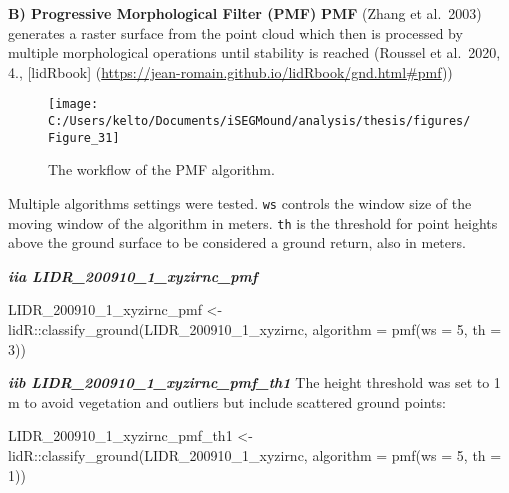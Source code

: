 \documentclass[
  12pt,
]{article}
\newenvironment{Shaded}{\begin{snugshade}}{\end{snugshade}}
\newcommand{\AttributeTok}[1]{\textcolor[rgb]{0.77,0.63,0.00}{#1}}
\newcommand{\DecValTok}[1]{\textcolor[rgb]{0.00,0.00,0.81}{#1}}
\newcommand{\FunctionTok}[1]{\textcolor[rgb]{0.00,0.00,0.00}{#1}}
\newcommand{\NormalTok}[1]{#1}
\newcommand{\OtherTok}[1]{\textcolor[rgb]{0.56,0.35,0.01}{#1}}
\newcommand{\SpecialCharTok}[1]{\textcolor[rgb]{0.00,0.00,0.00}{#1}}
\begin{document}
\textbf{B) Progressive Morphological Filter (PMF)}
\newline
\textbf{PMF} (Zhang et al.~2003) generates a raster surface from the point cloud which then is processed by multiple morphological operations until stability is reached (Roussel et al.~2020, 4., {[}lidRbook{]} (\url{https://jean-romain.github.io/lidRbook/gnd.html\#pmf}))

\begin{figure}

{\centering \texttt{[image: C:/Users/kelto/Documents/iSEGMound/analysis/thesis/figures/Figure\_31]} 

}

\caption{The workflow of the PMF algorithm.}\label{fig:Figure31}
\end{figure}

Multiple algorithms settings were tested. \texttt{ws} controls the window size of the moving window of the algorithm in meters. \texttt{th} is the threshold for point heights above the ground surface to be considered a ground return, also in meters.

\textbf{\emph{iia LIDR\_200910\_1\_xyzirnc\_pmf}}

\begin{Shaded}
\begin{Highlighting}[]
\NormalTok{LIDR\_200910\_1\_xyzirnc\_pmf }\OtherTok{\textless{}{-}}\NormalTok{ lidR}\SpecialCharTok{::}\FunctionTok{classify\_ground}\NormalTok{(LIDR\_200910\_1\_xyzirnc, }\AttributeTok{algorithm =} \FunctionTok{pmf}\NormalTok{(}\AttributeTok{ws =} \DecValTok{5}\NormalTok{,}
    \AttributeTok{th =} \DecValTok{3}\NormalTok{))}
\end{Highlighting}
\end{Shaded}

\textbf{\emph{iib LIDR\_200910\_1\_xyzirnc\_pmf\_th1}}
\newline
The height threshold was set to 1 m to avoid vegetation and outliers but include scattered ground points:

\begin{Shaded}
\begin{Highlighting}[]
\NormalTok{LIDR\_200910\_1\_xyzirnc\_pmf\_th1 }\OtherTok{\textless{}{-}}\NormalTok{ lidR}\SpecialCharTok{::}\FunctionTok{classify\_ground}\NormalTok{(LIDR\_200910\_1\_xyzirnc, }\AttributeTok{algorithm =} \FunctionTok{pmf}\NormalTok{(}\AttributeTok{ws =} \DecValTok{5}\NormalTok{,}
    \AttributeTok{th =} \DecValTok{1}\NormalTok{))}
\end{Highlighting}
\end{Shaded}
\end{document}
